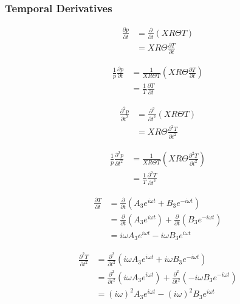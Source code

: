 \documentclass[a4paper]{article}
\begin{document}
\subsubsection{Temporal Derivatives}


\begin{align*}
    \frac{\partial p}{\partial t} 
    &=
    \frac{\partial }{\partial t}  \left( XR\Theta T \right) \\
    &=
    XR\Theta\frac{\partial T}{\partial t}  
\end{align*}

\begin{align*}
    \frac{1}{p}\frac{\partial p}{\partial t} 
    &=
    \frac{ 1}{X R \Theta T}  \left( XR\Theta\frac{\partial T}{\partial t} \right) \\
    &=\frac{ 1}{ T}\frac{\partial T}{\partial t}  
\end{align*}

\begin{align*}
    \frac{\partial^2 p}{\partial t^2} 
    &=
    \frac{\partial^2 }{\partial t^2}  \left( XR\Theta T \right) \\
    &=
    XR\Theta\frac{\partial^2 T}{\partial t^2}  
\end{align*}

\begin{align*}
    \frac{1}{p}\frac{\partial^2 p}{\partial t^2} 
    &=
    \frac{ 1}{X R \Theta T}  \left( XR\Theta\frac{\partial^2 T}{\partial t^2} \right) \\
    &=\frac{ 1}{ T}\frac{\partial^2 T}{\partial t^2}  
\end{align*}

\begin{align*}
    \frac{\partial T}{\partial t} &=
    \frac{\partial}{\partial t}
        \left( 
        A_3 e^{i \omega t} + B_3 e^{-i \omega t}
    \right)  \\
    &=
    \frac{\partial}{\partial t} \left(A_3 e^{i \omega t}  \right) +
    \frac{\partial}{\partial t} \left(B_3 e^{-i \omega t}  \right)\\ 
    &= i \omega A_3 e^{i \omega t} - i \omega B_3 e^{i \omega t} 
\end{align*}

\begin{align*}
    \frac{\partial^2 T}{\partial t^2} &=
    \frac{\partial^2}{\partial t^2}
        \left( 
        i \omega A_3 e^{i \omega t} + i \omega B_3 e^{-i \omega t}
    \right)  \\
    &=
    \frac{\partial^2}{\partial t^2} \left(i \omega A_3 e^{i \omega t}  \right) +
    \frac{\partial^2}{\partial t^2} \left(- i \omega B_3 e^{-i \omega t}  \right)\\ 
    &= (i \omega)^2 A_3 e^{i \omega t} - (i \omega)^2 B_3 e^{i \omega t} 
\end{align*}
\end{document}

